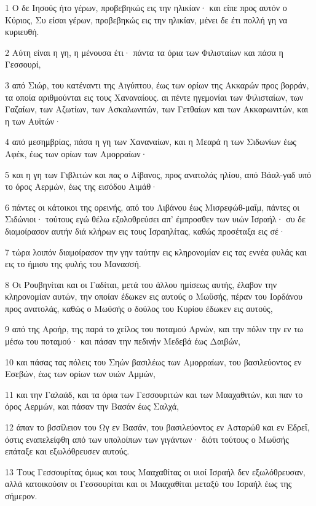 \par 1 Ο δε Ιησούς ήτο γέρων, προβεβηκώς εις την ηλικίαν· και είπε προς αυτόν ο Κύριος, Συ είσαι γέρων, προβεβηκώς εις την ηλικίαν, μένει δε έτι πολλή γη να κυριευθή.
\par 2 Αύτη είναι η γη, η μένουσα έτι· πάντα τα όρια των Φιλισταίων και πάσα η Γεσσουρί,
\par 3 από Σιώρ, του κατέναντι της Αιγύπτου, έως των ορίων της Ακκαρών προς βορράν, τα οποία αριθμούνται εις τους Χαναναίους. αι πέντε ηγεμονίαι των Φιλισταίων, των Γαζαίων, των Αζωτίων, των Ασκαλωνιτών, των Γετθαίων και των Ακκαρωνιτών, και η των Αυϊτών·
\par 4 από μεσημβρίας, πάσα η γη των Χαναναίων, και η Μεαρά η των Σιδωνίων έως Αφέκ, έως των ορίων των Αμορραίων·
\par 5 και η γη των Γιβλιτών και πας ο Λίβανος, προς ανατολάς ηλίου, από Βάαλ-γαδ υπό το όρος Αερμών, έως της εισόδου Αιμάθ·
\par 6 πάντες οι κάτοικοι της ορεινής, από του Λιβάνου έως Μισρεφώθ-μαΐμ, πάντες οι Σιδώνιοι· τούτους εγώ θέλω εξολοθρεύσει απ' έμπροσθεν των υιών Ισραήλ· συ δε διαμοίρασον αυτήν διά κλήρων εις τους Ισραηλίτας, καθώς προσέταξα εις σέ·
\par 7 τώρα λοιπόν διαμοίρασον την γην ταύτην εις κληρονομίαν εις τας εννέα φυλάς και εις το ήμισυ της φυλής του Μανασσή.
\par 8 Οι Ρουβηνίται και οι Γαδίται, μετά του άλλου ημίσεως αυτής, έλαβον την κληρονομίαν αυτών, την οποίαν έδωκεν εις αυτούς ο Μωϋσής, πέραν του Ιορδάνου προς ανατολάς, καθώς ο Μωϋσής ο δούλος του Κυρίου έδωκεν εις αυτούς,
\par 9 από της Αροήρ, της παρά το χείλος του ποταμού Αρνών, και την πόλιν την εν τω μέσω του ποταμού· και πάσαν την πεδινήν Μεδεβά έως Δαιβών,
\par 10 και πάσας τας πόλεις του Σηών βασιλέως των Αμορραίων, του βασιλεύοντος εν Εσεβών, έως των ορίων των υιών Αμμών,
\par 11 και την Γαλαάδ, και τα όρια των Γεσσουριτών και των Μααχαθιτών, και παν το όρος Αερμών, και πάσαν την Βασάν έως Σαλχά,
\par 12 άπαν το βσσίλειον του Ωγ εν Βασάν, του βασιλεύοντος εν Ασταρώθ και εν Εδρεΐ, όστις εναπελείφθη από των υπολοίπων των γιγάντων· διότι τούτους ο Μωϋσής επάταξε και εξωλόθρευσεν αυτούς.
\par 13 Τους Γεσσουρίτας όμως και τους Μααχαθίτας οι υιοί Ισραήλ δεν εξωλόθρευσαν, αλλά κατοικούσιν οι Γεσσουρίται και οι Μααχαθίται μεταξύ του Ισραήλ έως της σήμερον.
